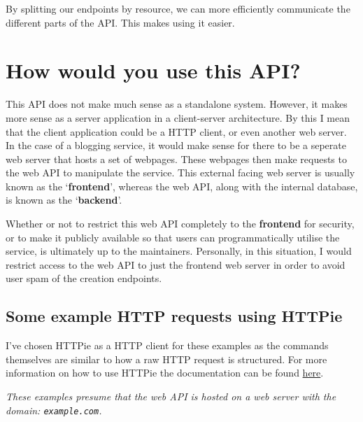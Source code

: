 \documentclass[]{full}
\theoremstyle{definition}
\begin{document}
By splitting our endpoints by resource, we can more efficiently communicate the different parts of the API. This makes using it easier.

\section{How would you use this API?}

This API does not make much sense as a standalone system. However, it makes more sense as a server application in a client-server architecture. By this I mean that the client application could be a HTTP client, or even another web server. In the case of a blogging service, it would make sense for there to be a seperate web server that hosts a set of webpages. These webpages then make requests to the web API to manipulate the service. This external facing web server is usually known as the `\textbf{frontend}', whereas the web API, along with the internal database, is known as the `\textbf{backend}'.

Whether or not to restrict this web API completely to the \textbf{frontend} for security, or to make it publicly available so that users can programmatically utilise the service, is ultimately up to the maintainers. Personally, in this situation, I would restrict access to the web API to just the frontend web server in order to avoid user spam of the creation endpoints.

\subsection{Some example HTTP requests using HTTPie}

I've chosen HTTPie as a HTTP client for these examples as the commands themselves are similar to how a raw HTTP request is structured. For more information on how to use HTTPie the documentation can be found \href{https://httpie.io/docs/cli/examples}{here}.

\cprotect\textit{These examples presume that the web API is hosted on a web server with the domain: \verb|example.com|.}
\end{document}
